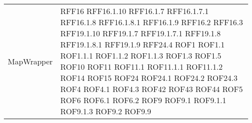 \begin{longtable}{p{5cm}!{\VRule[1pt]}p{2.5cm}}
	MapWrapper & RFF16 \newline RFF16.1.10 \newline RFF16.1.7 \newline RFF16.1.7.1 \newline RFF16.1.8 \newline RFF16.1.8.1 \newline RFF16.1.9 \newline RFF16.2 \newline RFF16.3 \newline RFF19.1.10 \newline RFF19.1.7 \newline RFF19.1.7.1 \newline RFF19.1.8 \newline RFF19.1.8.1 \newline RFF19.1.9 \newline RFF24.4 \newline ROF1 \newline ROF1.1 \newline ROF1.1.1 \newline ROF1.1.2 \newline ROF1.1.3 \newline ROF1.3 \newline ROF1.5 \newline ROF10 \newline ROF11 \newline ROF11.1 \newline ROF11.1.1 \newline ROF11.1.2 \newline ROF14 \newline ROF15 \newline ROF24 \newline ROF24.1 \newline ROF24.2 \newline ROF24.3 \newline ROF4 \newline ROF4.1 \newline ROF4.3 \newline ROF42 \newline ROF43 \newline ROF44 \newline ROF5 \newline ROF6 \newline ROF6.1 \newline ROF6.2 \newline ROF9 \newline ROF9.1 \newline ROF9.1.1 \newline ROF9.1.3 \newline ROF9.2 \newline ROF9.9\\

\end{longtable}
